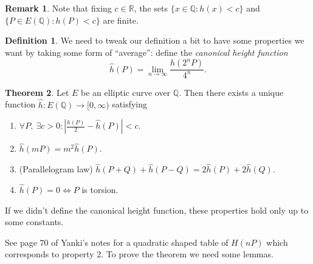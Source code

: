 \documentclass{article}
\newcommand{\Q}{\mathbb{Q}}
\newcommand{\R}{\mathbb{R}}
\theoremstyle{definition}
\newtheorem{defn}{Definition}[subsection]
\newtheorem{thm}[defn]{Theorem}
\newtheorem*{remark}{Remark}
\begin{document}
\begin{remark}
Note that fixing $c\in\R$, the sets $\{x\in\Q:h(x)<c\}$ and $\{P\in E(\Q):h(P)<c\}$ are finite.
\end{remark}

\begin{defn}
We need to tweak our definition a bit to have some properties we want by taking some form of ``average'': define the \textit{canonical height function}
\[
\widehat h(P)=\lim_{n\rightarrow\infty}\frac{h(2^nP)}{4^n}.
\]
\end{defn}

\begin{thm}
\label{thm:canonicalheight}
Let $E$ be an elliptic curve over $\Q$. Then there exists a unique function $\widehat h:E(\Q)\rightarrow[0,\infty)$ satisfying
\begin{enumerate}
\item $\forall P,\ \exists c>0:\left|\frac{h(P)}{2}-\widehat h(P)\right|<c$.
\item $\widehat h(mP)=m^2\widehat h(P)$.
\item (Parallelogram law) $\widehat h(P+Q)+\widehat h(P-Q)=2\widehat h(P)+2\widehat h(Q)$.
\item $\widehat h(P)=0\iff P$ is torsion.
\end{enumerate}

If we didn't define the canonical height function, these properties hold only up to some constants.
\end{thm}

See page 70 of Yanki's notes for a quadratic shaped table of $H(nP)$ which corresponds to property 2. To prove the theorem we need some lemmas.
\end{document}
